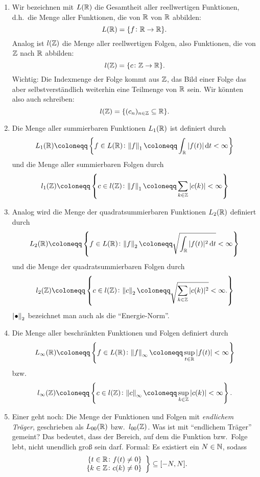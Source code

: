 \begin{definition}[Funktionenräume] \leavevmode
\begin{enumerate}
\item Wir bezeichnen mit $ L(\mathbb{R}) $ die Gesamtheit aller reellwertigen Funktionen, d.h.\ die Menge 
  aller Funktionen, die von $ \mathbb{R} $ von $ \mathbb{R} $ abbilden:
  \[
    L(\mathbb{R}) = \{ f \colon \mathbb{R} \rightarrow \mathbb{R} \}.
  \]
  Analog ist $ l(\mathbb{Z}) $ die Menge aller reellwertigen Folgen, also Funktionen, die von $ \mathbb{Z} $ nach
  $ \mathbb{R} $ abbilden:
  \[
    l(\mathbb{Z}) = \{ c \colon \mathbb{Z} \rightarrow \mathbb{R} \}.
  \]
  Wichtig: Die Indexmenge der Folge kommt aus $ \mathbb{Z} $, das Bild einer Folge das aber 
  selbstverständlich weiterhin eine Teilmenge von $ \mathbb{R} $ sein. Wir könnten also auch schreiben:
  \[
    l(\mathbb{Z}) = \{ (c_{n})_{n \in \mathbb{Z}} \subseteq \mathbb{R} \}.
  \]
\item Die Menge aller summierbaren Funktionen $ L_{1}(\mathbb{R}) $ ist definiert durch
\[ 
  L_{1}(\R) \coloneqq \left\{
    f \in L(\R) \colon \norm{f}_{1} \coloneqq \int_{\R} |f(t)| \dif t < \infty
  \right\}
\]
und die Menge aller summierbaren Folgen durch
\[ 
  l_{1}(\Z) \coloneqq \left\{
    c \in l(\Z) \colon \norm{f}_{1} \coloneqq \sum_{k \in \Z} |c(k)| < \infty
  \right\}
\]

\item Analog wird die Menge der quadratsummierbaren Funktionen $ L_{2}(\mathbb{R}) $ definiert durch
\[ 
  L_{2}(\R) \coloneqq \left\{
    f \in L(\R) \colon \norm{f}_{2} \coloneqq \sqrt{ \int_{\R} |f(t)|^{2} \dif t } < \infty
  \right\}
\]
und die Menge der quadratsummierbaren Folgen durch
\[ 
  l_{2}(\Z) \coloneqq \left\{
    c \in l(\Z) \colon \norm{c}_{2} \coloneqq \sqrt{ \sum_{k \in \Z} |c(k)|^{2} } < \infty.
  \right\}
\]
$ \norm{\bullet}_{2} $ bezeichnet man auch als die \enquote{Energie-Norm}.
\item Die Menge aller beschränkten Funktionen und Folgen definiert durch
\[
  L_{\infty}(\R) \coloneqq \left\{
    f \in L(\R) \colon \norm{f}_{\infty} \coloneqq
      \sup_{t \in \R} |f(t)| < \infty
  \right\}
\]
bzw.
\[
  l_{\infty}(\Z) \coloneqq \left\{
    c \in l(\Z) \colon \norm{c}_{\infty} \coloneqq
      \sup_{k \in \Z} |c(k)| < \infty
  \right\}.
\]
\item Einer geht noch: Die Menge der Funktionen und Folgen mit \emph{endlichem Träger}, geschrieben
als $ L_{00}(\mathbb{R}) $ bzw.\ $ l_{00}(\mathbb{Z}) $. Was ist mit \enquote{endlichem Träger} gemeint? Das 
bedeutet, dass der Bereich, auf dem die Funktion bzw.\ Folge lebt, nicht unendlich groß sein darf.
Formal: Es existiert ein $ N \in \mathbb{N} $, sodass
\[
  \left.
  \begin{array}{r}
    \{ t \in \mathbb{R} \colon f(t) \neq 0 \} \\
    \{ k \in \mathbb{Z} \colon c(k) \neq 0 \}
  \end{array}
  \right\}
  \subseteq [-N, N].
\]
\end{enumerate}
\end{definition}


